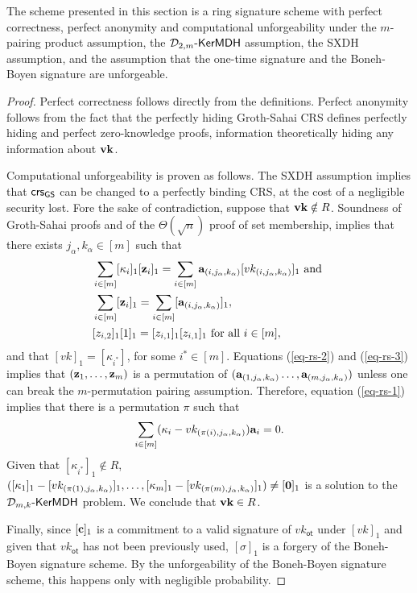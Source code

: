 \begin{theorem}
The scheme presented in this section is a ring signature scheme
with perfect correctness, perfect anonymity and computational unforgeability under the
$m$-pairing product assumption, the $\mathcal{D}_{2,m}\mbox{-}\mathsf{KerMDH}$ assumption, the SXDH assumption, and the assumption
that the one-time signature and the Boneh-Boyen signature are unforgeable.
\end{theorem}
\begin{proof}
Perfect correctness follows directly from the definitions. Perfect anonymity follows from the fact that the perfectly hiding Groth-Sahai CRS defines perfectly hiding and perfect zero-knowledge proofs, information theoretically hiding any information about $\mathbf{vk}$.

Computational unforgeability is proven as follows. The SXDH assumption implies that $\mathsf{crs}_{\mathsf{GS}}$ can be changed to a perfectly binding CRS, at the cost of a negligible security lost. Fore the sake of contradiction, suppose that $\mathbf{vk}\notin R$. Soundness of Groth-Sahai proofs and of the $\Theta(\sqrt{n})$ proof of set membership, implies that there exists $j_\alpha,k_\alpha\in[m]$ such that
\begin{align}
&\sum_{i\in[m]}[\kappa_i]_1[\mathbf{z}_i]_1=\sum_{i\in[m]}\mathbf{a}_{(i,j_\alpha,k_\alpha)}[vk_{(i,j_\alpha,k_\alpha)}]_1\text{ and }\label{eq-rs-1}\\
&\sum_{i\in[m]}[\mathbf{z}_i]_1=\sum_{i\in[m]}[\mathbf{a}_{(i,j_\alpha,k_\alpha)}]_1, \label{eq-rs-2}\\
&[z_{i,2}]_1[1]_1=[z_{i,1}]_1[z_{i,1}]_1 \text{ for all }i\in[m],\label{eq-rs-3}
\end{align}
and that $[vk]_1=[\kappa_{i^*}]$, for some $i^*\in[m]$. Equations (\ref{eq-rs-2}) and (\ref{eq-rs-3}) implies that $(\mathbf{z}_1,\ldots,\mathbf{z}_m)$ is a permutation of $(\mathbf{a}_{(1,j_\alpha,k_\alpha)}\ldots,\mathbf{a}_{(m,j_\alpha,k_\alpha)})$ unless one can break the $m$-permutation pairing assumption. Therefore, equation (\ref{eq-rs-1}) implies that there is a permutation $\pi$ such that
\begin{align}
\sum_{i\in[m]}(\kappa_i-vk_{(\pi(i),j_\alpha,k_\alpha)})\mathbf{a}_i=0.
\end{align}
Given that $[\kappa_{i^*}]_1\notin R$, $([\kappa_1]_1-[vk_{(\pi(1),j_\alpha,k_\alpha)}]_1,\ldots,[\kappa_m]_1-[vk_{(\pi(m),j_\alpha,k_\alpha)}]_1)\neq [\mathbf{0}]_1$ is a solution to the $\mathcal{D}_{m,k}\mbox{-}\mathsf{KerMDH}$ problem. We conclude that $\mathbf{vk}\in R$.

Finally, since $[\mathbf{c}]_1$ is a commitment to a valid signature of $vk_\mathsf{ot}$ under $[vk]_1$ and given that $vk_\mathsf{ot}$ has not been previously used, $[\sigma]_1$ is a forgery of the Boneh-Boyen signature scheme. By the unforgeability of the Boneh-Boyen signature scheme, this happens only with negligible probability.
\end{proof}
